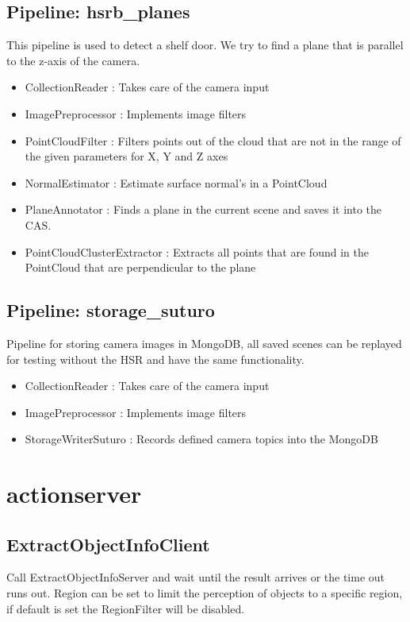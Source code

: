 \documentclass[main.tex]{subfiles}
\begin{document}
			\subsection{Pipeline: hsrb\_planes} 
This pipeline is used to detect a shelf door. We try to find a plane that is parallel to the z-axis of the camera.
\begin{itemize}
	\item CollectionReader : Takes care of the camera input
	\item ImagePreprocessor : Implements image filters  
	\item PointCloudFilter : Filters points out of the cloud that are not in the range of the given parameters for X, Y and Z axes
	\item NormalEstimator : Estimate surface normal's in a PointCloud 
	\item PlaneAnnotator : Finds a plane in the current scene and saves it into the CAS.
	\item PointCloudClusterExtractor : Extracts all points that are found in the PointCloud that are perpendicular to the plane 
\end{itemize}

			\subsection{Pipeline: storage\_suturo} 
Pipeline for storing camera images in MongoDB, all saved scenes can be replayed for testing without the HSR and have the same functionality. 
\begin{itemize}
	\item CollectionReader : Takes care of the camera input
	\item ImagePreprocessor : Implements image filters 
	\item StorageWriterSuturo :  Records defined camera topics into the MongoDB
\end{itemize}

		\section{actionserver}
			\subsection{ExtractObjectInfoClient}
Call ExtractObjectInfoServer and wait until the result arrives or the time out runs out. Region can be set to limit the perception of objects to a specific region, if default is set the RegionFilter will be disabled. 
\end{document}
